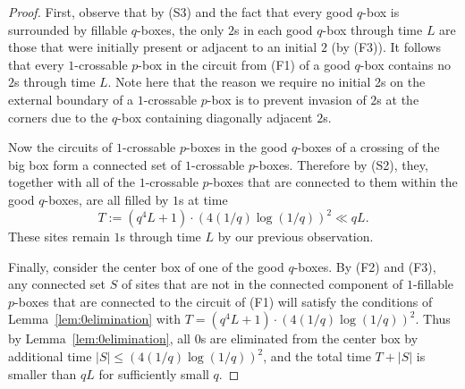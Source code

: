 \documentclass{article}
\numberwithin{equation}{section}
\begin{document}
\begin{proof}

    

    First, observe that by (S3) and the fact that every good $q$-box is surrounded by fillable $q$-boxes, the only $2$s in each good $q$-box through time $L$ are those that were initially present or adjacent to an initial $2$ (by (F3)). 
    It follows that every $1$-crossable $p$-box in the circuit from (F1) of a good $q$-box contains no $2$s through time $L$. Note here that the reason we require no initial 2s on the external boundary of a $1$-crossable $p$-box is to prevent invasion of $2$s at the corners due to the $q$-box containing diagonally adjacent $2$s.

    Now the circuits of $1$-crossable $p$-boxes in the good $q$-boxes of a crossing of the big box form a connected set of $1$-crossable $p$-boxes.
    Therefore by (S2), they, together with all of the $1$-crossable $p$-boxes that are connected to them within the good $q$-boxes, are all filled by $1$s at time 
    $$
    T := (q^{4}L + 1)\cdot (4(1/q)\log(1/q))^2 \ll qL.
    $$
    These sites remain $1$s through time $L$ by our previous observation.
    
    Finally, consider the center box of one of the good $q$-boxes. 
    By (F2) and (F3), any connected set $S$ of sites that are not in the connected component of $1$-fillable $p$-boxes that are connected to the circuit of (F1) will satisfy the conditions of Lemma~\ref{lem:0elimination} with $T = (q^{4}L + 1)\cdot (4(1/q)\log(1/q))^2$. 
    Thus by Lemma~\ref{lem:0elimination}, all $0$s are eliminated from the center box by additional time $|S|\le (4(1/q)\log(1/q))^2$, and the total time $T + |S|$ is smaller than $qL$ for sufficiently small $q$. 
\end{proof}
\end{document}
